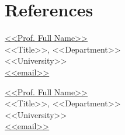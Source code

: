 \documentclass[a4paper,10pt]{article}
\begin{document}
\section{References}
\begin{minipage}[t]{0.48\textwidth}
\href{<<faculty page url>>}{<<Prof. Full Name>>}\\
<<Title>>, <<Department>>\\
<<University>>\\
\href{mailto:<<email>>}{<<email>>}
\end{minipage}
\begin{minipage}[t]{0.48\textwidth}
\href{<<faculty page url>>}{<<Prof. Full Name>>}\\
<<Title>>, <<Department>>\\
<<University>>\\
\href{mailto:<<email>>}{<<email>>}
\end{minipage}
\end{document}

